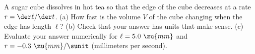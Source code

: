A sugar cube dissolves
in hot tea so that the edge of the cube decreases
at a rate $r=\der\ell/\der t$.
(a) How fast is the volume $V$ of
the cube changing when the edge has length $\ell$?
(b) Check that your answer has units that make sense.
(c) Evaluate your answer numerically for $\ell=5.0\ \zu{mm}$
and $r=-0.3\ \zu{mm}/\sunit$
(millimeters per second). 
\answercheck
